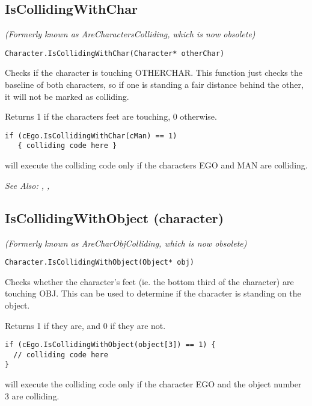 \subsection{IsCollidingWithChar}\label{Character.IsCollidingWithChar}%

\it{(Formerly known as AreCharactersColliding, which is now obsolete)}

\begin{verbatim}
Character.IsCollidingWithChar(Character* otherChar)
\end{verbatim}
Checks if the character is touching OTHERCHAR. This function just checks
the baseline of both characters, so if one is standing a fair distance behind
the other, it will not be marked as colliding.

Returns 1 if the characters feet are touching, 0 otherwise.

\begin{verbatim}
if (cEgo.IsCollidingWithChar(cMan) == 1)
   { colliding code here }
\end{verbatim}
will execute the colliding code only if the characters EGO and MAN are colliding.

\it{See Also:} ,
,


\subsection{IsCollidingWithObject (character)}\label{Character.IsCollidingWithObject}%

\it{(Formerly known as AreCharObjColliding, which is now obsolete)}

\begin{verbatim}
Character.IsCollidingWithObject(Object* obj)
\end{verbatim}
Checks whether the character's feet (ie. the bottom third of the character) are
touching OBJ. This can be used to determine if the character is standing on the object.

Returns 1 if they are, and 0 if they are not.

\begin{verbatim}
if (cEgo.IsCollidingWithObject(object[3]) == 1) {
  // colliding code here
}
\end{verbatim}
will execute the colliding code only if the character EGO and the object number 3 are colliding.

